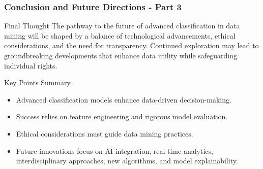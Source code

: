 \documentclass[aspectratio=169]{beamer}
\begin{document}
\begin{frame}[fragile]
    \frametitle{Conclusion and Future Directions - Part 3}
    \begin{block}{Final Thought}
        The pathway to the future of advanced classification in data mining will be shaped by a balance of technological advancements, ethical considerations, and the need for transparency. Continued exploration may lead to groundbreaking developments that enhance data utility while safeguarding individual rights.
    \end{block}
    
    \begin{block}{Key Points Summary}
        \begin{itemize}
            \item Advanced classification models enhance data-driven decision-making.
            \item Success relies on feature engineering and rigorous model evaluation.
            \item Ethical considerations must guide data mining practices.
            \item Future innovations focus on AI integration, real-time analytics, interdisciplinary approaches, new algorithms, and model explainability.
        \end{itemize}
    \end{block}
\end{frame}
\end{document}
